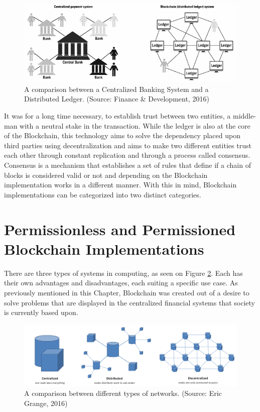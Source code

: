 \begin{figure}[h]
  \centering
  \includegraphics[width=1\linewidth]{imgs/blockchainvscentralizedNetwork.png}
  \caption{\label{fig:centralizedvsdescentralized} A comparison between a
  Centralized Banking System and a Distributed Ledger. (Source: Finance \&
  Development, 2016)}
\end{figure}

It was for a long time necessary, to establish trust between two entities, a
middle-man with a neutral stake in the transaction. While the ledger is also at
the core of the Blockchain, this technology aims to solve the dependency placed
upon third parties using decentralization and aims to make two different
entities trust each other through constant replication and through a process
called consensus.  Consensus is a mechanism that establishes a set of rules
that define if a chain of blocks is considered valid or not and depending on
the Blockchain implementation works in a different manner. With this in mind,
Blockchain implementations can be categorized into two distinct categories.

\section{Permissionless and Permissioned Blockchain Implementations}

There are three types of systems in computing, as seen on Figure
\ref{fig:typesofnetworks}. Each has their own advantages and disadvantages,
each suiting a specific use case. As previously mentioned in this Chapter,
Blockchain was created out of a desire to solve problems that are displayed in
the centralized financial systems that society is currently based upon.

\begin{figure}[h]
	\centering
	\includegraphics[width=1\linewidth]{imgs/typesofnetworks.png}
  \caption{\label{fig:typesofnetworks} A comparison between different types of
  networks. (Source: Eric Grange, 2016)}
\end{figure}

